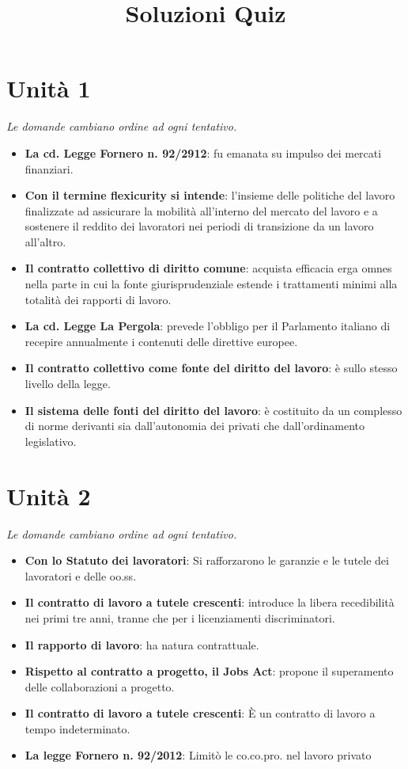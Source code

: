 \documentclass[12pt, a4paper]{report}
\begin{document}
\begin{titlepage}
    \title{Soluzioni Quiz}
    \author{}
    \date{}
\end{titlepage}
\maketitle
\tableofcontents
\chapter{Unità 1}
    \textit{Le domande cambiano ordine ad ogni tentativo.}
    \begin{itemize}
        \item \textbf{La cd. Legge Fornero n. 92/2912}: fu emanata su impulso dei mercati finanziari.
        \item \textbf{Con il termine flexicurity si intende}: l’insieme delle politiche del lavoro finalizzate ad assicurare la mobilità all’interno del mercato del lavoro e a sostenere il reddito dei lavoratori nei periodi di transizione da un lavoro all’altro.
        \item \textbf{Il contratto collettivo di diritto comune}: acquista efficacia erga omnes nella parte in cui la fonte giurisprudenziale estende i trattamenti minimi alla totalità dei rapporti di lavoro.
        \item \textbf{La cd. Legge La Pergola}: prevede l’obbligo per il Parlamento italiano di recepire annualmente i contenuti delle direttive europee.
        \item \textbf{Il contratto collettivo come fonte del diritto del lavoro}: è sullo stesso livello della legge.
        \item \textbf{Il sistema delle fonti del diritto del lavoro}: è costituito da un complesso di norme derivanti sia dall’autonomia dei privati che dall’ordinamento legislativo.
    \end{itemize}
\chapter{Unità 2}
    \textit{Le domande cambiano ordine ad ogni tentativo.}
    \begin{itemize}
        \item \textbf{Con lo Statuto dei lavoratori}: Si rafforzarono le garanzie e le tutele dei lavoratori e delle oo.ss.
        \item \textbf{Il contratto di lavoro a tutele crescenti}: introduce la libera recedibilità nei primi tre anni, tranne che per i licenziamenti discriminatori.
        \item \textbf{Il rapporto di lavoro}: ha natura contrattuale.
        \item \textbf{Rispetto al contratto a progetto, il Jobs Act}: propone il superamento delle collaborazioni a progetto.
        \item \textbf{Il contratto di lavoro a tutele crescenti}: È un contratto di lavoro a tempo indeterminato.
        \item \textbf{La legge Fornero n. 92/2012}: Limitò le co.co.pro. nel lavoro privato
    \end{itemize}
\end{document}
